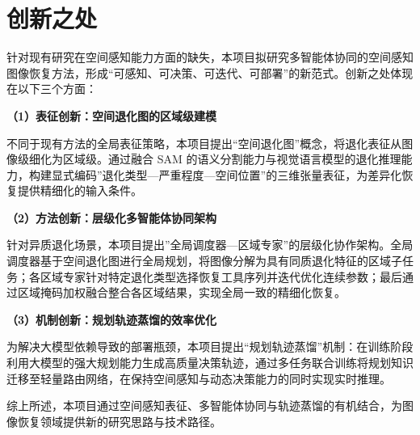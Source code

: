 \section{创新之处}

针对现有研究在空间感知能力方面的缺失，本项目拟研究多智能体协同的空间感知图像恢复方法，形成“可感知、可决策、可迭代、可部署”的新范式。创新之处体现在以下三个方面：

\textbf{（1）表征创新：空间退化图的区域级建模}

不同于现有方法的全局表征策略，本项目提出“空间退化图”概念，将退化表征从图像级细化为区域级。通过融合 SAM 的语义分割能力与视觉语言模型的退化推理能力，构建显式编码”退化类型—严重程度—空间位置”的三维张量表征，为差异化恢复提供精细化的输入条件。

\textbf{（2）方法创新：层级化多智能体协同架构}

针对异质退化场景，本项目提出”全局调度器—区域专家”的层级化协作架构。全局调度器基于空间退化图进行全局规划，将图像分解为具有同质退化特征的区域子任务；各区域专家针对特定退化类型选择恢复工具序列并迭代优化连续参数；最后通过区域掩码加权融合整合各区域结果，实现全局一致的精细化恢复。

\textbf{（3）机制创新：规划轨迹蒸馏的效率优化}

为解决大模型依赖导致的部署瓶颈，本项目提出“规划轨迹蒸馏”机制：在训练阶段利用大模型的强大规划能力生成高质量决策轨迹，通过多任务联合训练将规划知识迁移至轻量路由网络，在保持空间感知与动态决策能力的同时实现实时推理。

综上所述，本项目通过空间感知表征、多智能体协同与轨迹蒸馏的有机结合，为图像恢复领域提供新的研究思路与技术路径。
